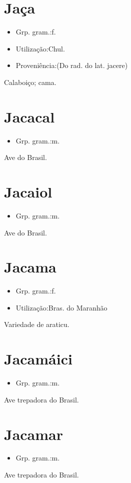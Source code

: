 \documentclass{article}
\begin{document}
\section{Jaça}
\begin{itemize}
\item {Grp. gram.:f.}
\end{itemize}
\begin{itemize}
\item {Utilização:Chul.}
\end{itemize}
\begin{itemize}
\item {Proveniência:(Do rad. do lat. \textunderscore jacere\textunderscore )}
\end{itemize}
Calaboiço; cama.
\section{Jacacal}
\begin{itemize}
\item {Grp. gram.:m.}
\end{itemize}
Ave do Brasil.
\section{Jacaiol}
\begin{itemize}
\item {Grp. gram.:m.}
\end{itemize}
Ave do Brasil.
\section{Jacama}
\begin{itemize}
\item {Grp. gram.:f.}
\end{itemize}
\begin{itemize}
\item {Utilização:Bras. do Maranhão}
\end{itemize}
Variedade de araticu.
\section{Jacamáici}
\begin{itemize}
\item {Grp. gram.:m.}
\end{itemize}
Ave trepadora do Brasil.
\section{Jacamar}
\begin{itemize}
\item {Grp. gram.:m.}
\end{itemize}
Ave trepadora do Brasil.
\end{document}
